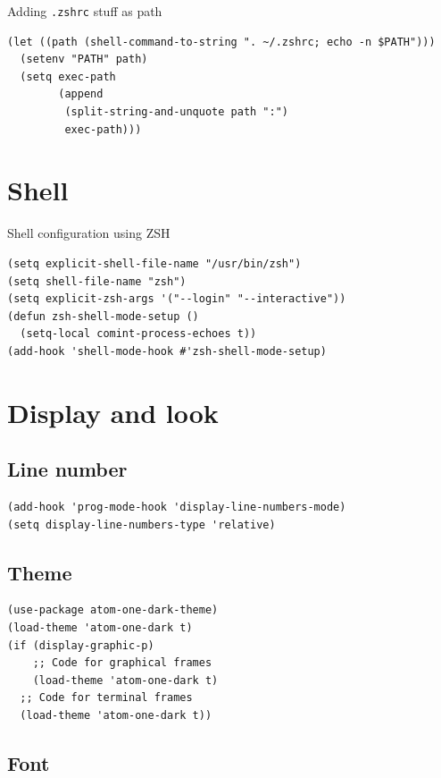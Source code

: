 \documentclass[11pt]{article}
\begin{document}
Adding \texttt{.zshrc} stuff as path

\begin{verbatim}
(let ((path (shell-command-to-string ". ~/.zshrc; echo -n $PATH")))
  (setenv "PATH" path)
  (setq exec-path 
        (append
         (split-string-and-unquote path ":")
         exec-path)))
\end{verbatim}

\section{Shell}
\label{sec:orgf301913}

Shell configuration using ZSH

\begin{verbatim}
(setq explicit-shell-file-name "/usr/bin/zsh")
(setq shell-file-name "zsh")
(setq explicit-zsh-args '("--login" "--interactive"))
(defun zsh-shell-mode-setup ()
  (setq-local comint-process-echoes t))
(add-hook 'shell-mode-hook #'zsh-shell-mode-setup)
\end{verbatim}

\section{Display and look}
\label{sec:orgfa1d00c}
\subsection{Line number}
\label{sec:org50cdebf}
\begin{verbatim}
(add-hook 'prog-mode-hook 'display-line-numbers-mode)
(setq display-line-numbers-type 'relative)
\end{verbatim}

\subsection{Theme}
\label{sec:org0eeee7b}

\begin{verbatim}
(use-package atom-one-dark-theme)
(load-theme 'atom-one-dark t)
(if (display-graphic-p)
    ;; Code for graphical frames
    (load-theme 'atom-one-dark t)
  ;; Code for terminal frames
  (load-theme 'atom-one-dark t))

\end{verbatim}

\subsection{Font}
\label{sec:orga179470}
\end{document}
